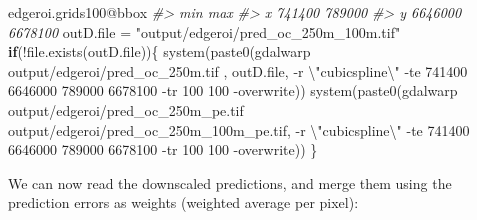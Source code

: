 \documentclass[
  graybox,natbib,nospthms]{svmono}
\newenvironment{Shaded}{\begin{snugshade}}{\end{snugshade}}
\newcommand{\CommentTok}[1]{\textcolor[rgb]{0.37,0.37,0.37}{\textit{#1}}}
\newcommand{\ControlFlowTok}[1]{\textcolor[rgb]{0.27,0.27,0.27}{\textbf{#1}}}
\newcommand{\FunctionTok}[1]{\textcolor[rgb]{0,0,0}{#1}}
\newcommand{\NormalTok}[1]{#1}
\newcommand{\OtherTok}[1]{\textcolor[rgb]{0.37,0.37,0.37}{#1}}
\newcommand{\SpecialCharTok}[1]{\textcolor[rgb]{0,0,0}{#1}}
\newcommand{\StringTok}[1]{\textcolor[rgb]{0.5,0.5,0.5}{#1}}
\begin{document}
\begin{Shaded}
\begin{Highlighting}[]
\NormalTok{edgeroi.grids100}\SpecialCharTok{@}\NormalTok{bbox}
\CommentTok{\#\textgreater{}       min     max}
\CommentTok{\#\textgreater{} x  741400  789000}
\CommentTok{\#\textgreater{} y 6646000 6678100}
\NormalTok{outD.file }\OtherTok{=} \StringTok{"output/edgeroi/pred\_oc\_250m\_100m.tif"}
\ControlFlowTok{if}\NormalTok{(}\SpecialCharTok{!}\FunctionTok{file.exists}\NormalTok{(outD.file))\{}
  \FunctionTok{system}\NormalTok{(}\FunctionTok{paste0}\NormalTok{(}\StringTok{\textquotesingle{}gdalwarp output/edgeroi/pred\_oc\_250m.tif \textquotesingle{}}\NormalTok{, outD.file,  }
         \StringTok{\textquotesingle{} {-}r }\SpecialCharTok{\textbackslash{}"}\StringTok{cubicspline}\SpecialCharTok{\textbackslash{}"}\StringTok{ {-}te 741400 6646000 789000 6678100 {-}tr 100 100 {-}overwrite\textquotesingle{}}\NormalTok{))}
  \FunctionTok{system}\NormalTok{(}\FunctionTok{paste0}\NormalTok{(}\StringTok{\textquotesingle{}gdalwarp output/edgeroi/pred\_oc\_250m\_pe.tif output/edgeroi/pred\_oc\_250m\_100m\_pe.tif\textquotesingle{}}\NormalTok{,}
         \StringTok{\textquotesingle{} {-}r }\SpecialCharTok{\textbackslash{}"}\StringTok{cubicspline}\SpecialCharTok{\textbackslash{}"}\StringTok{ {-}te 741400 6646000 789000 6678100 {-}tr 100 100 {-}overwrite\textquotesingle{}}\NormalTok{))}
\NormalTok{\}}
\end{Highlighting}
\end{Shaded}

We can now read the downscaled predictions, and merge them using the prediction errors as weights (weighted average per pixel):
\end{document}
